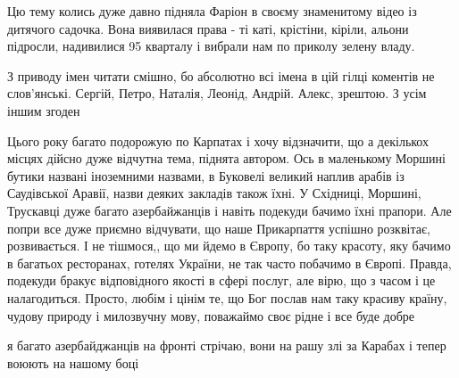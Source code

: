 \begin{itemize}
\begin{itemize}
Цю тему колись дуже давно підняла Фаріон в своєму знаменитому відео із дитячого
садочка. Вона виявилася права - ті каті, крістіни, кіріли, альони підросли,
надивилися 95 кварталу і вибрали нам по приколу зелену владу.


 

З приводу імен читати смішно, бо абсолютно всі імена в цій гілці коментів не
слов'янські. Сергій, Петро, Наталія, Леонід, Андрій. Алекс, зрештою. З усім
іншим згоден

\end{itemize}

 

Цього року багато подорожую по Карпатах і хочу відзначити, що а декількох місцях
дійсно дуже відчутна тема, піднята автором. Ось в маленькому Моршині бутики
названі іноземними назвами, в Буковелі великий наплив арабів із Саудівської
Аравії, назви деяких закладів також їхні. У Східниці, Моршині, Трускавці дуже
багато азербайжанців і навіть подекуди бачимо їхні прапори. Але попри все дуже
приємно відчувати, що наше Прикарпаття успішно розквітає, розвивається. І не
тішмося,, що ми йдемо в Європу, бо таку красоту, яку бачимо в багатьох
ресторанах, готелях України, не так часто побачимо в Європі. Правда, подекуди
бракує відповідного якості в сфері послуг, але вірю, що з часом і це
налагодиться. Просто, любім і цінім те, що Бог послав нам таку красиву
країну, чудову природу і милозвучну мову, поважаймо своє рідне і все буде добре

\begin{itemize}
 
я багато азербайджанців на фронті стрічаю, вони на рашу злі за Карабах і тепер воюють на нашому боці
\end{itemize}

 

\end{itemize}
